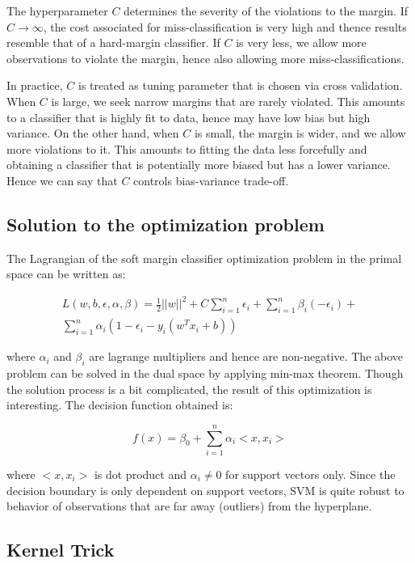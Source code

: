 \documentclass[conference]{IEEEtran}
\begin{document}
The hyperparameter $C$ determines the severity of the violations to the margin. If $C \rightarrow \infty$, the cost associated for miss-classification is very high and thence results resemble that of a hard-margin classifier. If $C$ is very less, we allow more observations to violate the margin, hence also allowing more miss-classifications.

In practice, $C$ is treated as tuning parameter that is chosen via cross validation. When $C$ is large, we seek narrow margins that are rarely violated. This amounts to a classifier that is highly fit to data, hence may have low bias but high variance. On the other hand, when $C$ is small, the margin is wider, and we allow more violations to it. This amounts to fitting the data less forcefully and obtaining a classifier that is potentially more biased but has a lower variance. Hence we can say that $C$ controls bias-variance trade-off.

\subsection{Solution to the optimization problem}

The Lagrangian of the soft margin classifier optimization problem in the primal space can be written as:

\begin{align*}
  L(w, b, \epsilon, \alpha, \beta) = \frac{1}{2}{||w||^2} + C\sum_{i=1}^{n}\epsilon _i + \sum_{i=1}^{n}\beta_i(-\epsilon _i) + \\
  \sum_{i=1}^{n}\alpha_i(1 - \epsilon _i - y_i(w^Tx_i + b)) 
\end{align*}

where $\alpha_i$ and $\beta_i$ are lagrange multipliers and hence are non-negative. The above problem can be solved in the dual space by applying min-max theorem. Though the solution process is a bit complicated, the result of this optimization is interesting. The decision function obtained is:

$$ f(x) = \beta_0 + \sum_{i = 1}^n\alpha_i <x, x_i> $$

where $< x, x_i >$ is dot product and $\alpha_i \neq 0$ for support vectors only. Since the decision boundary is only dependent on support vectors, SVM is quite robust to behavior of observations that are far away (outliers) from the hyperplane.

\subsection{Kernel Trick}
\end{document}
